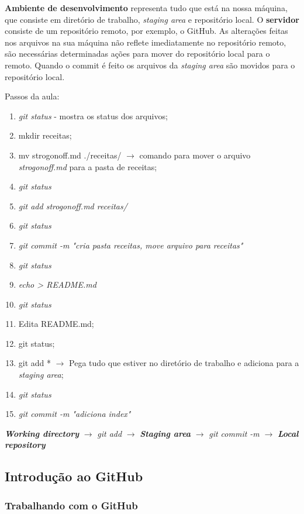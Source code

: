 \documentclass[12pt,a4paper]{article}
\begin{document}
	\textbf{Ambiente de desenvolvimento} representa tudo que está na nossa máquina, que consiste em diretório de trabalho, \textit{staging area} e repositório local. O \textbf{servidor} consiste de um repositório remoto, por exemplo, o GitHub. As alterações feitas nos arquivos na sua máquina não reflete imediatamente no repositório remoto, são necessárias determinadas ações para mover do repositório local para o remoto. Quando o commit é feito os arquivos da \textit{staging area} são movidos para o repositório local.
	
	Passos da aula:
	\begin{enumerate}
		\item \textit{git status} - mostra os status dos arquivos;
		\item mkdir receitas;
		\item mv strogonoff.md ./receitas/ $\rightarrow$ comando para mover o arquivo \textit{strogonoff.md} para a pasta de receitas;
		\item \textit{git status}
		\item \textit{git add strogonoff.md receitas/}
		\item \textit{git status}
		\item \textit{git commit -m "cria pasta receitas, move arquivo para receitas"}
		\item \textit{git status}
		\item \textit{echo > README.md}
		\item \textit{git status}
		\item Edita README.md;
		\item git status;
		\item git add * $\rightarrow$ Pega tudo que estiver no diretório de trabalho e adiciona para a \textit{staging area};
		\item \textit{git status}
		\item \textit{git commit -m "adiciona index"}
	\end{enumerate}

	\textbf{\textit{Working directory}} $\rightarrow$ \textit{git add} $\rightarrow$ \textbf{\textit{Staging area}} $\rightarrow$ \textit{git commit -m} $\rightarrow$ \textbf{\textit{Local repository}}
	
	\subsection{Introdução ao GitHub}
	\subsubsection{Trabalhando com o GitHub}
	
\end{document}
